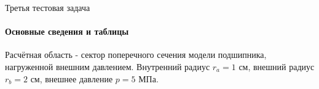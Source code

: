\documentclass{beamer}
\begin{document}
\begin{frame}{Третья тестовая задача}
\framesubtitle{Основные сведения и таблицы}
\footnotesize
\begin{multicols}{2}
Расчётная область - сектор поперечного сечения модели подшипника, нагруженной внешним давлением. Внутренний радиус $r_a = 1$ см, внешний радиус $r_b = 2$ см, внешнее давление $p = 5$ МПа.
\begin{figure}[h]
\end{figure}

\columnbreak


\end{multicols}
\end{frame}
\end{document}
